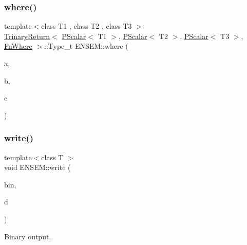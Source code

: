\subsubsection{\texorpdfstring{where()}{where()}}
{\footnotesize\ttfamily template$<$class T1 , class T2 , class T3 $>$ \\
\mbox{\hyperlink{structENSEM_1_1TrinaryReturn}{Trinary\+Return}}$<$ \mbox{\hyperlink{classENSEM_1_1PScalar}{P\+Scalar}}$<$ T1 $>$, \mbox{\hyperlink{classENSEM_1_1PScalar}{P\+Scalar}}$<$ T2 $>$, \mbox{\hyperlink{classENSEM_1_1PScalar}{P\+Scalar}}$<$ T3 $>$, \mbox{\hyperlink{structENSEM_1_1FnWhere}{Fn\+Where}} $>$\+::Type\+\_\+t E\+N\+S\+E\+M\+::where (\begin{DoxyParamCaption}\item[{const \mbox{\hyperlink{classENSEM_1_1PScalar}{P\+Scalar}}$<$ T1 $>$ \&}]{a,  }\item[{const \mbox{\hyperlink{classENSEM_1_1PScalar}{P\+Scalar}}$<$ T2 $>$ \&}]{b,  }\item[{const \mbox{\hyperlink{classENSEM_1_1PScalar}{P\+Scalar}}$<$ T3 $>$ \&}]{c }\end{DoxyParamCaption})\hspace{0.3cm}{\ttfamily [inline]}}

\mbox{\label{group__primscalar_ga7db0b2a7539f81de4777d87b90de73c6}} 
\subsubsection{\texorpdfstring{write()}{write()}}
{\footnotesize\ttfamily template$<$class T $>$ \\
void E\+N\+S\+E\+M\+::write (\begin{DoxyParamCaption}\item[{\mbox{\hyperlink{classADATIO_1_1BinaryWriter}{A\+D\+A\+T\+I\+O\+::\+Binary\+Writer}} \&}]{bin,  }\item[{const \mbox{\hyperlink{classENSEM_1_1PScalar}{P\+Scalar}}$<$ T $>$ \&}]{d }\end{DoxyParamCaption})\hspace{0.3cm}{\ttfamily [inline]}}



Binary output. 

